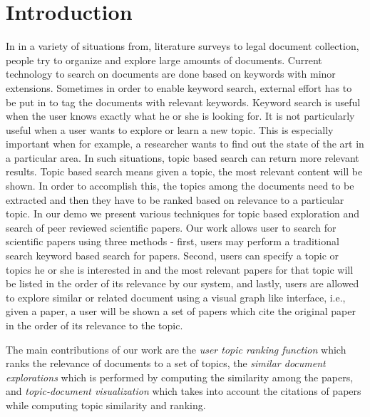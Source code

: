 \section{Introduction}

In in a variety of situations from, literature surveys to legal document collection, people try to organize and explore large amounts of documents. Current technology to search on documents are done based on keywords with minor extensions. Sometimes in order to enable keyword search, external effort has to be put in to tag the documents with relevant keywords. Keyword search is useful when the user knows exactly what he or she is looking for. It is not particularly useful when a user wants to explore or learn a new topic. This is especially important when for example, a researcher wants to find out the state of the art in a particular area. In such situations, topic based search can return more relevant results. Topic based search means given a topic, the most relevant content will be shown. In order to accomplish this, the topics among the documents need to be extracted and then they have to be ranked based on relevance to a particular topic. In our demo we present various techniques for topic based exploration and search of peer reviewed scientific papers. Our work allows user to search for scientific papers using three methods - first, users may perform a traditional search keyword based search for papers. Second, users can specify a topic or topics he or she is interested in and the most relevant papers for that topic will be listed in the order of its relevance by our system, and lastly, users are allowed to explore similar or related document using a visual graph like interface, i.e., given a paper, a user will be shown a set of papers which cite the original paper in the order of its relevance to the topic. 


The main contributions of our work are the \emph{user topic ranking function} which ranks the relevance of documents to a set of topics, the \emph{similar document explorations} which is performed by computing the similarity among the papers, and \emph{topic-document visualization} which takes into account the citations of papers while computing topic similarity and ranking.

